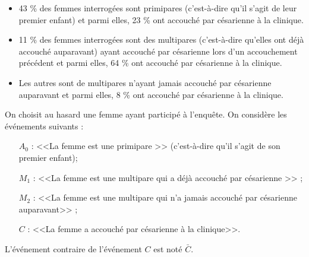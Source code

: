 \begin{itemize}
	\item 43 \% des femmes interrogées sont primipares (c'est-à-dire qu'il s'agit de leur premier enfant) et parmi elles, 23 \% ont accouché par césarienne à la clinique.
	\item 11 \% des femmes interrogées sont des multipares (c'est-à-dire qu'elles ont déjà accouché auparavant) ayant accouché par césarienne lors d'un accouchement précédent et parmi elles, 64 \% ont accouché par césarienne à la clinique.
	\item Les autres sont de multipares n'ayant jamais accouché par césarienne auparavant et parmi elles, 8 \% ont accouché par césarienne à la clinique.	
\end{itemize}

On choisit au hasard une femme ayant participé à l'enquête.
On considère les événements suivants :
\begin{itemize}
	\item[$A_0$ :]  <<La femme est une primipare >> (c'est-à-dire qu'il s'agit de son premier enfant);
	\item[$M_1$ :]  <<La femme est une multipare qui a déjà accouché par césarienne >> ;
	\item[$M_2$ :]  <<La femme est une multipare qui n'a jamais accouché par césarienne auparavant>> ;
	\item[$C$ :] <<La femme a accouché par césarienne à la clinique>>.
\end{itemize}

L'événement contraire de l'événement $C$ est noté $\bar{C}$.

